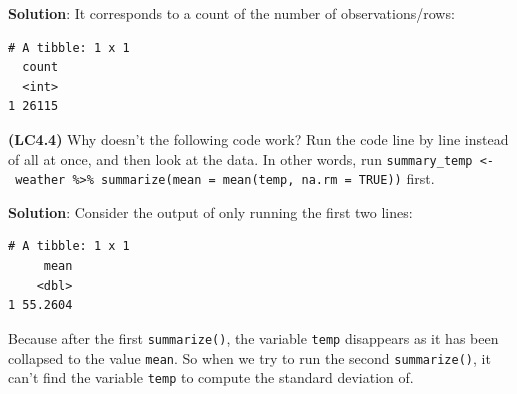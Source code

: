 \documentclass[12pt, krantz2,]{krantz}
\makeatletter
\newenvironment{Shaded}{\begin{snugshade}}{\end{snugshade}}
\newcommand{\DataTypeTok}[1]{\textcolor[rgb]{0.27,0.27,0.27}{#1}}
\newcommand{\KeywordTok}[1]{\textcolor[rgb]{0.27,0.27,0.27}{\textbf{#1}}}
\newcommand{\NormalTok}[1]{#1}
\newcommand{\OperatorTok}[1]{\textcolor[rgb]{0.43,0.43,0.43}{\textbf{#1}}}
\newcommand{\OtherTok}[1]{\textcolor[rgb]{0.37,0.37,0.37}{#1}}
\newcommand{\StringTok}[1]{\textcolor[rgb]{0.5,0.5,0.5}{#1}}
\newenvironment{kframe}{%
\medskip{}
\setlength{\fboxsep}{.8em}
 \def\at@end@of@kframe{}%
 \ifinner\ifhmode%
  \def\at@end@of@kframe{\end{minipage}}%
  \begin{minipage}{\columnwidth}%
 \fi\fi%
 \def\FrameCommand##1{\hskip\@totalleftmargin \hskip-\fboxsep
 \colorbox{shadecolor}{##1}\hskip-\fboxsep
     \hskip-\linewidth \hskip-\@totalleftmargin \hskip\columnwidth}%
 \MakeFramed {\advance\hsize-\width
   \@totalleftmargin\z@ \linewidth\hsize
   \@setminipage}}%
 {\par\unskip\endMakeFramed%
 \at@end@of@kframe}
\renewenvironment{Shaded}{\begin{kframe}}{\end{kframe}}
\makeatother
\begin{document}
\textbf{Solution}: It corresponds to a count of the number of observations/rows:

\begin{Shaded}
\end{Shaded}

\begin{verbatim}
# A tibble: 1 x 1
  count
  <int>
1 26115
\end{verbatim}

\textbf{(LC4.4)} Why doesn't the following code work? Run the code line by line instead of all at once, and then look at the data. In other words, run \texttt{summary\_temp\ \textless{}-\ weather\ \%\textgreater{}\%\ summarize(mean\ =\ mean(temp,\ na.rm\ =\ TRUE))} first.

\begin{Shaded}
\end{Shaded}

\textbf{Solution}: Consider the output of only running the first two lines:

\begin{Shaded}
\end{Shaded}

\begin{verbatim}
# A tibble: 1 x 1
     mean
    <dbl>
1 55.2604
\end{verbatim}

Because after the first \texttt{summarize()}, the variable \texttt{temp} disappears as it has been collapsed to the value \texttt{mean}. So when we try to run the second \texttt{summarize()}, it can't find the variable \texttt{temp} to compute the standard deviation of.
\end{document}
